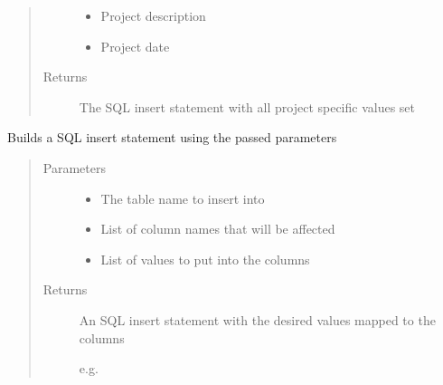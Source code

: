 \documentclass[letterpaper,10pt,english]{sphinxmanual}
\begin{document}
\begin{fulllineitems}
\begin{fulllineitems}
\begin{quote}
\begin{description}
\begin{itemize}
\item {} 
 \textendash{} Project description

\item {} 
 \textendash{} Project date

\end{itemize}

\item[{Returns}] \leavevmode
The SQL insert statement with all project specific values set

\end{description}\end{quote}

\end{fulllineitems}


\begin{fulllineitems}
\label{\detokenize{src:src.Database.DatabaseStatements.getInsertStatement}}
Builds a SQL insert statement using the passed parameters
\begin{quote}\begin{description}
\item[{Parameters}] \leavevmode\begin{itemize}
\item {} 
 \textendash{} The table name to insert into

\item {} 
 \textendash{} List of column names that will be affected

\item {} 
 \textendash{} List of values to put into the columns

\end{itemize}

\item[{Returns}] \leavevmode

An SQL insert statement with the desired values mapped to the columns

e.g. 


\end{description}\end{quote}


\end{fulllineitems}
\end{fulllineitems}
\end{document}
